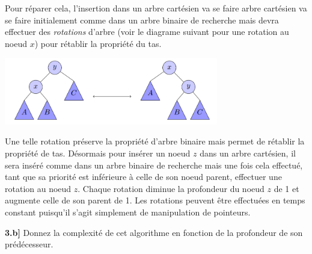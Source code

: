 \documentclass[a4paper,12pt]{report}
\begin{document}

\newpage

Pour réparer cela, l'insertion dans un arbre cartésien va se faire arbre cartésien va se faire initialement comme dans un arbre binaire de recherche mais 
    devra effectuer des \textit{rotations} d'arbre (voir le diagrame suivant pour une rotation au noeud \( x \)) pour rétablir la propriété du tas.\\
\begin{center}
    \includegraphics[width=0.7\textwidth]{../images/rotationExplication.png}\\[-0.5cm]
\end{center}

Une telle rotation préserve la propriété d'arbre binaire mais permet de rétablir la propriété de tas. Désormais pour insérer un noeud \( z \) dans un arbre 
    cartésien, il sera inséré comme dans un arbre binaire de recherche mais une fois cela effectué, tant que sa priorité est inférieure à celle de son noeud 
    parent, effectuer une rotation au noeud \( z \). Chaque rotation diminue la profondeur du noeud \( z \) de 1 et augmente celle de son parent de 1. 
    Les rotations peuvent être effectuées en temps constant puisqu'il s'agit simplement de manipulation de pointeurs.

\vspace{2cm}


\textbf{3.b]} Donnez la complexité de cet algorithme en fonction de la profondeur de son prédécesseur.
\end{document}
